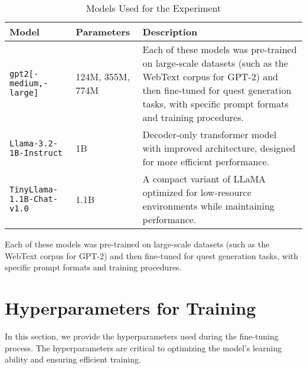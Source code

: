 \begin{table}[H]
  \centering
  \scriptsize
  \renewcommand{\arraystretch}{1.3}
  \begin{tabularx}{0.95\textwidth}{
    >{\raggedright\arraybackslash}p{4cm}
    >{\centering\arraybackslash}p{4cm}
    >{\raggedright\arraybackslash}X
  }
    \toprule
    \textbf{Model} & \textbf{Parameters} & \textbf{Description} \\
    \midrule
    \texttt{gpt2[-medium,-large]} & 124M, 355M, 774M & Each of these models was pre-trained on large-scale datasets (such as the WebText corpus for GPT-2) and then fine-tuned for quest generation tasks, with specific prompt formats and training procedures. \\
    \texttt{Llama-3.2-1B-Instruct} & 1B & Decoder-only transformer model with improved architecture, designed for more efficient performance. \\
    \texttt{TinyLlama-1.1B-Chat-v1.0} & 1.1B & A compact variant of LLaMA optimized for low-resource environments while maintaining performance. \\
    \bottomrule
  \end{tabularx}
  \caption{Models Used for the Experiment}
\end{table}

Each of these models was pre-trained on large-scale datasets (such as the WebText
corpus for GPT-2) and then fine-tuned for quest generation tasks, with specific prompt
formats and training procedures.

\section*{Hyperparameters for Training}

In this section, we provide the hyperparameters used during the fine-tuning process.
The hyperparameters are critical to optimizing the model's learning ability and ensuring
efficient training.

